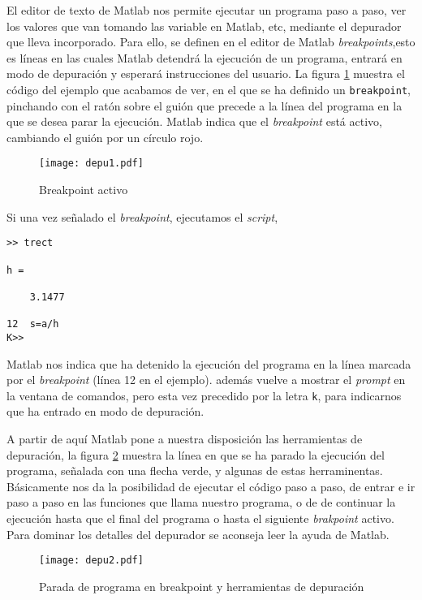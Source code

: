 \begin{enumerate}
El editor de texto de Matlab nos permite ejecutar un programa paso a paso, ver los valores que van tomando las variable en Matlab, etc, mediante el depurador que lleva incorporado. Para ello, se definen en el editor de Matlab \emph{breakpoints},esto es líneas en las cuales Matlab detendrá la ejecución de un programa, entrará en modo de depuración y esperará instrucciones del usuario. La figura \ref{fig:depu1} muestra el código del ejemplo que acabamos de ver, en el que se ha definido un \texttt{breakpoint}, pinchando con el ratón sobre el guión que precede a la línea del programa en la que se desea parar la ejecución. Matlab indica que el \emph{breakpoint} está activo, cambiando el guión por un círculo rojo.

\begin{figure}[h]
\centering
\texttt{[image: depu1.pdf]}
\caption{Breakpoint activo}
\label{fig:depu1}
\end{figure}

Si una vez señalado el \emph{breakpoint}, ejecutamos el \emph{script},
\begin{verbatim}
>> trect

h =

    3.1477

12  s=a/h
K>> 
\end{verbatim}

Matlab nos indica que ha detenido la ejecución del programa en la línea marcada por el \emph{breakpoint} (línea 12 en el ejemplo). además vuelve a mostrar el \emph{prompt} en la ventana de comandos, pero esta vez precedido por la letra \texttt{k}, para indicarnos que ha entrado en modo de depuración.

A partir de aquí Matlab pone a nuestra disposición las herramientas de depuración, la figura \ref{fig:depu2} muestra la línea en que se ha parado la ejecución del programa, señalada con una flecha verde, y algunas de estas herraminentas. Básicamente nos da la posibilidad de ejecutar el código paso a paso, de entrar e ir paso a paso en las funciones que llama nuestro programa, o de de continuar la ejecución hasta que el final del programa o hasta el siguiente \emph{brakpoint} activo. Para dominar los detalles del depurador se aconseja leer la ayuda de Matlab.


\begin{figure}[h]
\centering
\texttt{[image: depu2.pdf]}
\caption{Parada de programa en breakpoint y herramientas de depuración}
\label{fig:depu2}
\end{figure}


\end{enumerate}
